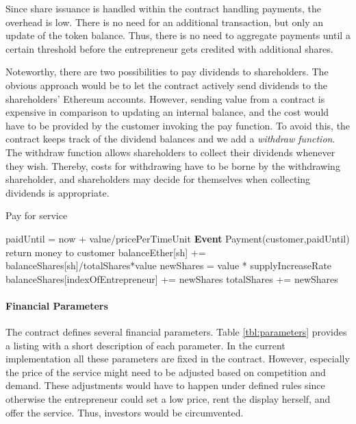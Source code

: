 Since share issuance is handled within the contract handling payments, the overhead is low. There is no need for an additional transaction, but only an update of the token balance. Thus, there is no need to aggregate payments until a certain threshold before the entrepreneur gets credited with additional shares. 

Noteworthy, there are two possibilities to pay dividends to shareholders. The obvious approach would be to let the contract actively send dividends to the shareholders' Ethereum accounts. However, sending value from a contract is expensive in comparison to updating an internal balance, and the cost would have to be provided by the customer invoking the pay function. To avoid this, the contract keeps track of the dividend balances and we add a \emph{withdraw function}. The withdraw function allows shareholders to collect their dividends whenever they wish. Thereby, costs for withdrawing have to be borne by the withdrawing shareholder, and shareholders may decide for themselves when collecting dividends is appropriate. 

\begin{algorithm}[!t]
   \caption{Pay for service}
    \begin{algorithmic}[1]
      \State {}
      \State {}
      \State paidUntil = now + value/pricePerTimeUnit
      \State \textbf{Event} Payment(customer,paidUntil)
      \Else 
      \State return money to customer
      \EndIf
      \Statex
      \State balanceEther[sh] += balanceShares[sh]/totalShares*value
      \EndFor
      \EndFunction
      \Statex
      \State newShares = value * supplyIncreaseRate
      \State balanceShares[indexOfEntrepreneur] += newShares
      \State totalShares += newShares
      \EndFunction
\end{algorithmic}
\label{alg:payforservice}
\end{algorithm}

\paragraph{Financial Parameters}

The contract defines several financial parameters. Table \ref{tbl:parameters} provides a listing with a short description of each parameter. In the current implementation all these parameters are fixed in the contract. However, especially the price of the service might need to be adjusted based on competition and demand. These adjustments would have to happen under defined rules since otherwise the entrepreneur could set a low price, rent the display herself, and offer the service. Thus, investors would be circumvented.

